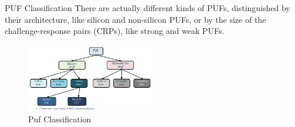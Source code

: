 \begin{section}{PUF Classification}
There are actually different kinds of PUFs, distinguished by their architecture, like silicon and
non-silicon PUFs, or by the size of the challenge-response pairs (CRPs), like strong and weak PUFs.
\begin{figure}[h]
  \centering
  \includegraphics[width=0.5\textwidth]{img/hardware/puf classif.png}
  \caption{Puf Classification}
\end{figure}


\end{section}
